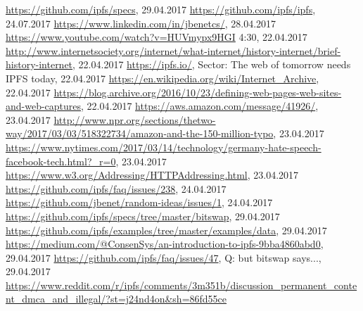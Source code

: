 \documentclass[a4paper,11pt, oneside]{report}
\theoremstyle{definition}
\begin{document}
\begin{thebibliography}{1}
 \url{https://github.com/ipfs/specs}, 29.04.2017
 \url{https://github.com/ipfs/ipfs}, 24.07.2017
 \url{https://www.linkedin.com/in/jbenetcs/}, 28.04.2017
 \url{https://www.youtube.com/watch?v=HUVmypx9HGI} 4:30, 22.04.2017
 \url{http://www.internetsociety.org/internet/what-internet/history-internet/brief-history-internet}, 22.04.2017
 \url{https://ipfs.io/}, Sector: The web of tomorrow needs IPFS today, 22.04.2017
 \url{https://en.wikipedia.org/wiki/Internet_Archive}, 22.04.2017
 \url{https://blog.archive.org/2016/10/23/defining-web-pages-web-sites-and-web-captures}, 22.04.2017
 \url{https://aws.amazon.com/message/41926/}, 23.04.2017
 \url{http://www.npr.org/sections/thetwo-way/2017/03/03/518322734/amazon-and-the-150-million-typo}, 23.04.2017
 \url{https://www.nytimes.com/2017/03/14/technology/germany-hate-speech-facebook-tech.html?_r=0}, 23.04.2017
 \url{https://www.w3.org/Addressing/HTTPAddressing.html}, 23.04.2017 
\url{https://github.com/ipfs/faq/issues/238}, 24.04.2017
 \url{https://github.com/jbenet/random-ideas/issues/1}, 24.04.2017
 \url{https://github.com/ipfs/specs/tree/master/bitswap}, 29.04.2017
 \url{https://github.com/ipfs/examples/tree/master/examples/data}, 29.04.2017
 \url{https://medium.com/@ConsenSys/an-introduction-to-ipfs-9bba4860abd0}, 29.04.2017
 \url{https://github.com/ipfs/faq/issues/47}, Q: but bitswap says..., 29.04.2017
\url{https://www.reddit.com/r/ipfs/comments/3m351b/discussion_permanent_content_dmca_and_illegal/?st=j24nd4on&sh=86fd55ce}
 
\end{thebibliography}


\printglossaries

\listoffigures
\end{document}
